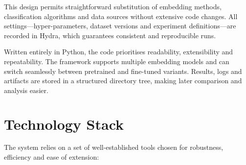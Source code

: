 \documentclass{SGGW-thesis-EN}
\begin{document}
This design permits straightforward substitution of embedding methods, classification algorithms and data sources
without extensive code changes. All settings—hyper-parameters, dataset versions and experiment definitions—are recorded
in Hydra, which guarantees consistent and reproducible runs.

Written entirely in Python, the code prioritises readability, extensibility and repeatability. The framework supports
multiple embedding models and can switch seamlessly between pretrained and fine-tuned variants. Results, logs and
artifacts are stored in a structured directory tree, making later comparison and analysis easier.


\section{Technology Stack}
The system relies on a set of well-established tools chosen for robustness, efficiency and ease of extension:
\end{document}
